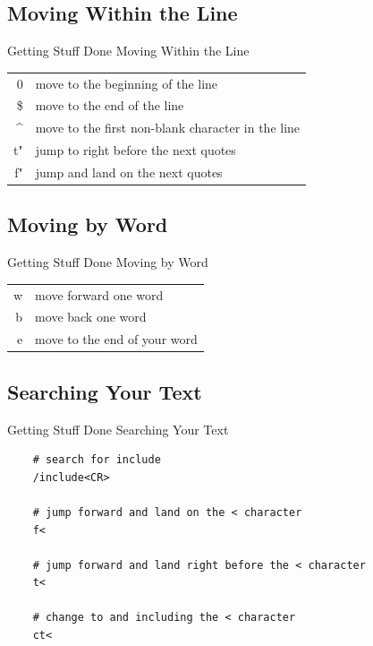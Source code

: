 \documentclass{beamer}
\begin{document}
\subsection{Moving Within the Line}
\begin{frame}[c]{Getting Stuff Done} {Moving Within the Line} 
    \begin{table}[htpb]
        \centering
        \begin{tabular}{r|l}
            0 & move to the beginning of the line \\
            \$ & move to the end of the line \\
            \^{} & move to the first non-blank character in the line \\
            t" & jump to right before the next quotes \\
            f" & jump and land on the next quotes \\
        \end{tabular}
    \end{table}
\end{frame}


\subsection{Moving by Word}
\begin{frame}[c]{Getting Stuff Done} {Moving by Word} 
    \begin{table}[htpb]
        \centering
        \begin{tabular}{r|l}
            w & move forward one word \\
            b & move back one word \\
            e & move to the end of your word \\
        \end{tabular}
    \end{table}
\end{frame}


\subsection{Searching Your Text}
\begin{frame}[fragile]{Getting Stuff Done} {Searching Your Text} 
    \begin{lstlisting}
    # search for include
    /include<CR>

    # jump forward and land on the < character
    f<

    # jump forward and land right before the < character
    t<

    # change to and including the < character
    ct<
    \end{lstlisting}  
\end{frame}
\end{document}
